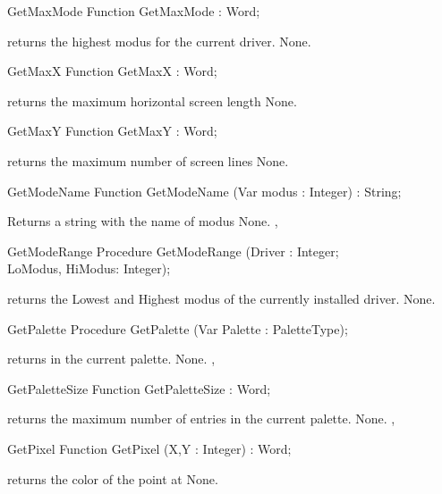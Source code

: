 \begin{function}{GetMaxMode}
\Declaration
Function GetMaxMode  : Word;

\Description
{} returns the highest modus for
the current driver.
\Errors
None.
\SeeAlso
{}
\end{function}
\begin{function}{GetMaxX}
\Declaration
Function GetMaxX  : Word;

\Description
{} returns the maximum horizontal screen
length
\Errors
None.
\SeeAlso
{}
\end{function}
\begin{function}{GetMaxY}
\Declaration
Function GetMaxY  : Word;

\Description
{} returns the maximum number of screen
lines
\Errors
None.
\SeeAlso
{}
\end{function}
\begin{function}{GetModeName}
\Declaration
Function GetModeName (Var modus : Integer) : String;

\Description

Returns a string with the name of modus
\Errors
None.
\SeeAlso
{}, 
\end{function}
\begin{procedure}{GetModeRange}
\Declaration
Procedure GetModeRange (Driver : Integer; \\ LoModus, HiModus: Integer);

\Description
{} returns the Lowest and Highest modus of the currently
installed driver.
\Errors
None.
\SeeAlso
{}
\end{procedure}
\begin{procedure}{GetPalette}
\Declaration
Procedure GetPalette (Var Palette : PaletteType);

\Description
{} returns in  the current palette.
\Errors
None.
\SeeAlso
{}, 
\end{procedure}
\begin{function}{GetPaletteSize}
\Declaration
Function GetPaletteSize  : Word;

\Description
{} returns the maximum
number of entries in the current palette.
\Errors
None.
\SeeAlso
{},
\end{function}
\begin{function}{GetPixel}
\Declaration
Function GetPixel (X,Y : Integer) : Word;

\Description
{} returns the color
of the point at  
\Errors
None.
\SeeAlso

\end{function}
